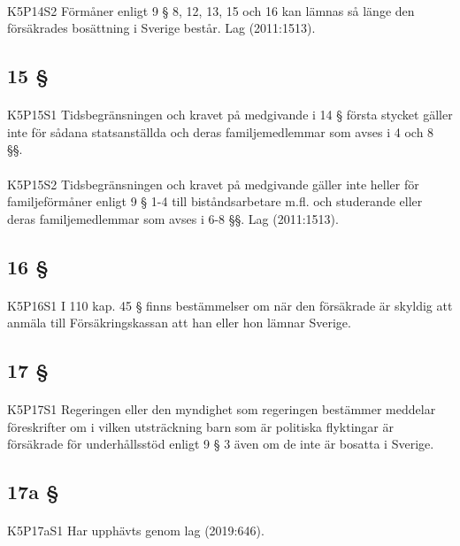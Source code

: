 \documentclass[a4paper,notitlepage,openany,10pt]{book}
\begin{document}
\paragraph*{}
{\tiny K5P14S2}
Förmåner enligt 9 § 8, 12, 13, 15 och 16 kan lämnas så länge den försäkrades bosättning i Sverige består.
Lag (2011:1513).
\subsection*{15 §}
\paragraph*{}
{\tiny K5P15S1}
Tidsbegränsningen och kravet på medgivande i 14 § första stycket gäller inte för sådana statsanställda och deras familjemedlemmar som avses i 4 och 8 §§.
\paragraph*{}
{\tiny K5P15S2}
Tidsbegränsningen och kravet på medgivande gäller inte heller för familjeförmåner enligt 9 § 1-4 till biståndsarbetare m.fl.
och studerande eller deras familjemedlemmar som avses i 6-8 §§.
Lag (2011:1513).
\subsection*{16 §}
\paragraph*{}
{\tiny K5P16S1}
I 110 kap. 45 § finns bestämmelser om när den försäkrade är skyldig att anmäla till Försäkringskassan att han eller hon lämnar Sverige.
\subsection*{17 §}
\paragraph*{}
{\tiny K5P17S1}
Regeringen eller den myndighet som regeringen bestämmer meddelar föreskrifter om i vilken utsträckning barn som är politiska flyktingar är försäkrade för underhållsstöd enligt 9 § 3 även om de inte är bosatta i Sverige.
\subsection*{17a §}
\paragraph*{}
{\tiny K5P17aS1}
Har upphävts genom
lag (2019:646).
\end{document}
